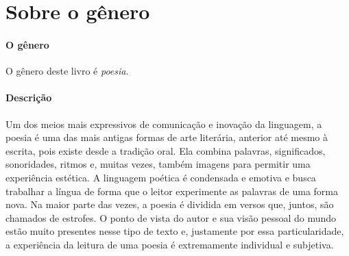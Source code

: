 \documentclass[11pt]{extarticle}
\begin{document}
\section{Sobre o gênero}

\paragraph{O gênero} O gênero deste livro é \textit{poesia}. 


\paragraph{Descrição} Um dos meios mais expressivos de comunicação e inovação da linguagem, a poesia é uma das mais antigas formas de arte literária, anterior até mesmo à escrita, pois existe desde a tradição oral. Ela combina palavras, significados, sonoridades, ritmos e, muitas vezes, também imagens para permitir uma experiência estética. A linguagem poética é condensada e emotiva e busca trabalhar a língua de forma que o leitor experimente as palavras de uma forma nova. Na maior parte das vezes, a poesia é dividida em versos que, juntos, são chamados de estrofes. O ponto de vista do autor e sua visão pessoal do mundo estão muito presentes nesse tipo de texto e, justamente por essa particularidade, a experiência da leitura de uma poesia é extremamente individual e subjetiva.

\end{document}
